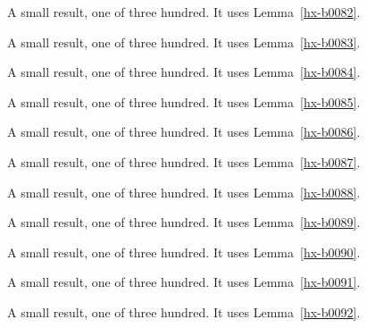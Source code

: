 \begin{lemma}[Bulk 83]\label{hx-b0083}
A small result, one of three hundred. It uses Lemma~\ref{hx-b0082}.
\end{lemma}

\begin{lemma}[Bulk 84]\label{hx-b0084}
A small result, one of three hundred. It uses Lemma~\ref{hx-b0083}.
\end{lemma}

\begin{lemma}[Bulk 85]\label{hx-b0085}
A small result, one of three hundred. It uses Lemma~\ref{hx-b0084}.
\end{lemma}

\begin{lemma}[Bulk 86]\label{hx-b0086}
A small result, one of three hundred. It uses Lemma~\ref{hx-b0085}.
\end{lemma}

\begin{lemma}[Bulk 87]\label{hx-b0087}
A small result, one of three hundred. It uses Lemma~\ref{hx-b0086}.
\end{lemma}

\begin{lemma}[Bulk 88]\label{hx-b0088}
A small result, one of three hundred. It uses Lemma~\ref{hx-b0087}.
\end{lemma}

\begin{lemma}[Bulk 89]\label{hx-b0089}
A small result, one of three hundred. It uses Lemma~\ref{hx-b0088}.
\end{lemma}

\begin{lemma}[Bulk 90]\label{hx-b0090}
A small result, one of three hundred. It uses Lemma~\ref{hx-b0089}.
\end{lemma}

\begin{lemma}[Bulk 91]\label{hx-b0091}
A small result, one of three hundred. It uses Lemma~\ref{hx-b0090}.
\end{lemma}

\begin{lemma}[Bulk 92]\label{hx-b0092}
A small result, one of three hundred. It uses Lemma~\ref{hx-b0091}.
\end{lemma}

\begin{lemma}[Bulk 93]\label{hx-b0093}
A small result, one of three hundred. It uses Lemma~\ref{hx-b0092}.
\end{lemma}

